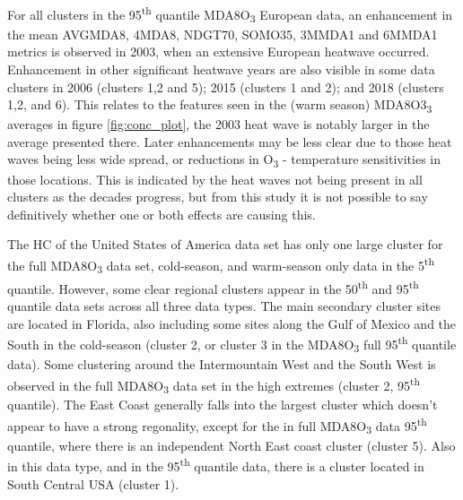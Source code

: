 \documentclass[journal abbreviation, manuscript]{copernicus}
\begin{document}
For all clusters in the 95\textsuperscript{th} quantile MDA8O\textsubscript{3} European data, an enhancement in the mean AVGMDA8, 4MDA8, NDGT70, SOMO35, 3MMDA1 and 6MMDA1 metrics is observed in 2003, when an extensive European heatwave occurred. Enhancement in other significant heatwave years are also visible in some data clusters in 2006 (clusters 1,2 and 5); 2015 (clusters 1 and 2); and 2018 (clusters 1,2, and 6). This relates to the features seen in the (warm season) MDA8O3\textsubscript{3} averages in figure \ref{fig:conc_plot}, the 2003 heat wave is notably larger in the average presented there. Later enhancements may be less clear due to those heat waves being less wide spread, or reductions in O\textsubscript{3} - temperature sensitivities in those locations. This is indicated by the heat waves not being present in all clusters as the decades progress, but from this study it is not possible to say definitively whether one or both effects are causing this.

The HC of the United States of America data set has only one large cluster for the full MDA8O\textsubscript{3} data set, cold-season, and warm-season only data in the 5\textsuperscript{th} quantile. However, some clear regional clusters appear in the 50\textsuperscript{th} and 95\textsuperscript{th} quantile data sets across all three data types. The main secondary cluster sites are located in Florida, also including some sites along the Gulf of Mexico and the South in the cold-season (cluster 2, or cluster 3 in the MDA8O\textsubscript{3} full 95\textsuperscript{th} quantile data). Some clustering around the Intermountain West and the South West is observed in the full MDA8O\textsubscript{3} data set in the high extremes (cluster 2, 95\textsuperscript{th} quantile). The East Coast generally falls into the largest cluster which doesn't appear to have a strong regonality, except for the in full MDA8O\textsubscript{3} data 95\textsuperscript{th} quantile, where there is an independent North East coast cluster (cluster 5). Also in this data type, and in the 95\textsuperscript{th} quantile data, there is a cluster located in South Central USA (cluster 1).
\end{document}

